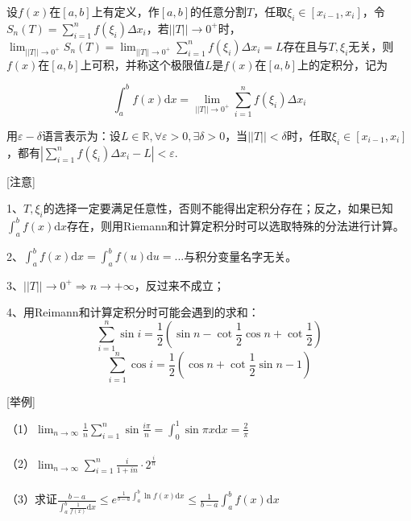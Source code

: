 \documentclass{SCIS2020cn}
\begin{document}
\begin{definition}[定积分]\label{def4}
设$f(x)$在$[a,b]$上有定义，作$[a,b]$的任意分割$T$，任取$\xi_i\in[x_{i-1},x_i]$，令$\displaystyle{}S_n(T)=\sum_{i=1}^nf(\xi_i)\Delta{}x_i$，若$||T||\rightarrow0^+$时，$\displaystyle{}\lim_{||T||\rightarrow0^+}S_n(T)=\lim_{||T||\rightarrow0^+}\sum_{i=1}^nf(\xi_i)\Delta{}x_i=L$存在且与$T,\xi_i$无关，则$f(x)$在$[a,b]$上可积，并称这个极限值$L$是$f(x)$在$[a,b]$上的定积分，记为

\begin{equation}
\int_a^b{f(x)\text{d}x}=\lim_{||T||\rightarrow0^+}\sum_{i=1}^nf(\xi_i)\Delta{}x_i
\end{equation}

用$\varepsilon-\delta$语言表示为：设$L\in\mathbb{R},\forall\varepsilon>0,\exists\delta>0$，当$||T||<\delta$时，任取$\xi_i\in[x_{i-1},x_i]$，都有$\displaystyle\left|\sum_{i=1}^nf(\xi_i)\Delta{}x_i-L\right|<\varepsilon$.

[注意]

1、$T,\xi_i$的选择一定要满足任意性，否则不能得出定积分存在；反之，如果已知$\displaystyle\int_a^b{f(x)\text{d}x}$存在，则用Riemann和计算定积分时可以选取特殊的分法进行计算。

2、$\displaystyle\int_a^b{f(x)\text{d}x}=\int_a^b{f(u)\text{d}u}=...$与积分变量名字无关。

3、$||T||\rightarrow0^+\Rightarrow{}n\rightarrow+\infty$，反过来不成立；

4、用Reimann和计算定积分时可能会遇到的求和：
\begin{equation}
\sum_{i=1}^n\sin{i}=\frac{1}{2}\left(\sin{n}-\cot{\frac{1}{2}}\cos{n}+\cot{\frac{1}{2}}\right)
\end{equation}
\begin{equation}
\sum_{i=1}^n\cos{i}=\frac{1}{2}\left(\cos{n}+\cot{\frac{1}{2}}\sin{n}-1\right)
\end{equation}

[举例]

（1）$\displaystyle\lim_{n\rightarrow\infty}{\frac{1}{n}\sum_{i=1}^n{\sin{\frac{i\pi}{n}}}}=\int_0^1{\sin{\pi{}x}}\text{d}x=\frac{2}{\pi}$\\\\

（2）$\displaystyle\lim_{n\rightarrow\infty}{\sum_{i=1}^n{\frac{i}{1+in}·2^{\frac{i}{n}}}}$\\\\

（3）求证$\displaystyle\frac{b-a}{\int_a^b{\frac{1}{f(x)}}\text{d}x}\leqslant{}e^{\frac{1}{b-a}\int_a^b{\ln{f(x)}\text{d}x}}\leqslant\frac{1}{b-a}\int_a^b{f(x)}\text{d}x$
\end{definition}
\end{document}
